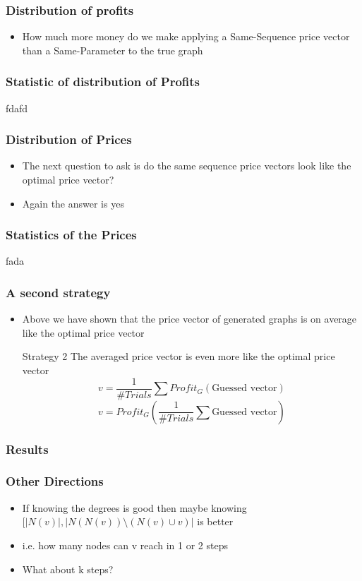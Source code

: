 \documentclass[a4paper,12pt]{beamer}
\begin{document}
\begin{frame}
  \frametitle{Distribution of profits}
  \begin{itemize}
    \item How much more money do we make applying a Same-Sequence price vector than a Same-Parameter to the true graph
  \end{itemize}
\end{frame}

\begin{frame}
  \frametitle{Statistic of distribution of Profits}
  fdafd
\end{frame}



\begin{frame}
  \frametitle{Distribution of Prices}
  \begin{itemize}
    \item The next question to ask is do the same sequence price vectors look like the optimal price vector?
    \item Again the answer is yes
  \end{itemize}
\end{frame}

\begin{frame}
  \frametitle{Statistics of the Prices}
  fada
\end{frame}

\begin{frame}
  \frametitle{A second strategy}
  \begin{itemize}
    \item Above we have shown that the price vector of generated graphs is on average like the optimal price vector
    \item [Strategy 2] The averaged price vector is even more like the optimal price vector
          \begin{equation}
            v = \frac{1}{\# Trials} \sum Profit_{G} (\text{Guessed vector})
          \end{equation}
          \begin{equation}
            v = Profit_G ( \frac{1}{\# Trials} \sum \text{Guessed vector} )
          \end{equation}
  \end{itemize}
\end{frame}

\begin{frame}
  \frametitle{Results}
\end{frame}


\begin{frame}
  \frametitle{Other Directions}
  \begin{itemize}
    \item If knowing the degrees is good then maybe knowing $[|N(v)|, |N(N(v))\setminus (N(v) \cup v ) |$ is better\\
    \item i.e. how many nodes can v reach in 1 or 2 steps \\
    \item What about k steps?
  \end{itemize}
\end{frame}
\end{document}
